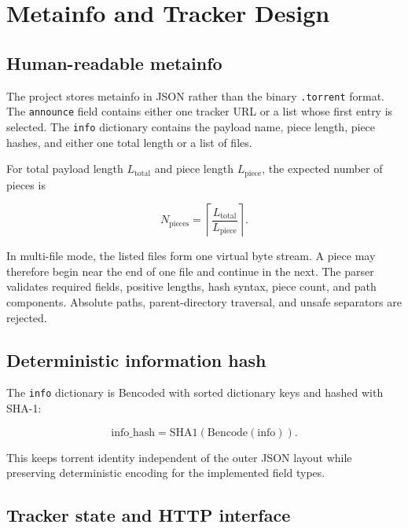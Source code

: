 \section{Metainfo and Tracker Design}
\label{sec:metainfo-tracker}

\subsection{Human-readable metainfo}

The project stores metainfo in JSON rather than the binary \texttt{.torrent} format. The \texttt{announce} field contains either one tracker URL or a list whose first entry is selected. The \texttt{info} dictionary contains the payload name, piece length, piece hashes, and either one total length or a list of files.

For total payload length $L_{\mathrm{total}}$ and piece length $L_{\mathrm{piece}}$, the expected number of pieces is

\begin{equation}
  N_{\mathrm{pieces}} =
  \left\lceil \frac{L_{\mathrm{total}}}{L_{\mathrm{piece}}} \right\rceil .
  \label{eq:piece-count}
\end{equation}

In multi-file mode, the listed files form one virtual byte stream. A piece may therefore begin near the end of one file and continue in the next. The parser validates required fields, positive lengths, hash syntax, piece count, and path components. Absolute paths, parent-directory traversal, and unsafe separators are rejected.

\subsection{Deterministic information hash}

The \texttt{info} dictionary is Bencoded with sorted dictionary keys and hashed with SHA-1:

\begin{equation}
  \mathrm{info\_hash} =
  \mathrm{SHA1}\!\left(\mathrm{Bencode}(\mathrm{info})\right).
  \label{eq:info-hash}
\end{equation}

This keeps torrent identity independent of the outer JSON layout while preserving deterministic encoding for the implemented field types.

\subsection{Tracker state and HTTP interface}

